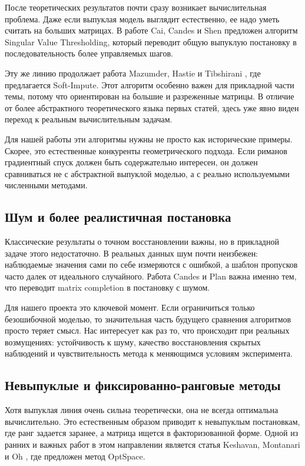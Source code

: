 \documentclass[a4paper,12pt]{article}
\begin{document}
После теоретических результатов почти сразу возникает вычислительная проблема. Даже если выпуклая модель выглядит естественно, ее надо уметь считать на больших матрицах. В работе Cai, Candes и Shen \cite{cai-svt} предложен алгоритм Singular Value Thresholding, который переводит общую выпуклую постановку в последовательность более управляемых шагов.

Эту же линию продолжает работа Mazumder, Hastie и Tibshirani \cite{mazumder}, где предлагается Soft-Impute. Этот алгоритм особенно важен для прикладной части темы, потому что ориентирован на большие и разреженные матрицы. В отличие от более абстрактного теоретического языка первых статей, здесь уже явно виден переход к реальным вычислительным задачам.

Для нашей работы эти алгоритмы нужны не просто как исторические примеры. Скорее, это естественные конкуренты геометрического подхода. Если риманов градиентный спуск должен быть содержательно интересен, он должен сравниваться не с абстрактной выпуклой моделью, а с реально используемыми численными методами.

\subsection{Шум и более реалистичная постановка}

Классические результаты о точном восстановлении важны, но в прикладной задаче этого недостаточно. В реальных данных шум почти неизбежен: наблюдаемые значения сами по себе измеряются с ошибкой, а шаблон пропусков часто далек от идеального случайного. Работа Candes и Plan \cite{candes-plan} важна именно тем, что переводит matrix completion в постановку с шумом.

Для нашего проекта это ключевой момент. Если ограничиться только безошибочной моделью, то значительная часть будущего сравнения алгоритмов просто теряет смысл. Нас интересует как раз то, что происходит при реальных возмущениях: устойчивость к шуму, качество восстановления скрытых наблюдений и чувствительность метода к меняющимся условиям эксперимента.

\subsection{Невыпуклые и фиксированно-ранговые методы}

Хотя выпуклая линия очень сильна теоретически, она не всегда оптимальна вычислительно. Это естественным образом приводит к невыпуклым постановкам, где ранг задается заранее, а матрица ищется в факторизованной форме. Одной из ранних и важных работ в этом направлении является статья Keshavan, Montanari и Oh \cite{keshavan}, где предложен метод OptSpace.
\end{document}
